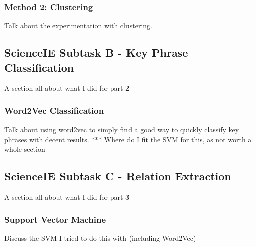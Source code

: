 \subsubsection{Method 2: Clustering}
Talk about the experimentation with clustering.

\subsection{ScienceIE Subtask B - Key Phrase Classification}
A section all about what I did for part 2
\subsubsection{Word2Vec Classification}
Talk about using word2vec to simply find a good way to quickly classify key phrases with decent results.
*** Where do I fit the SVM for this, as not worth a whole section

\subsection{ScienceIE Subtask C - Relation Extraction}
A section all about what I did for part 3
\subsubsection{Support Vector Machine}
Discuss the SVM I tried to do this with (including Word2Vec)
